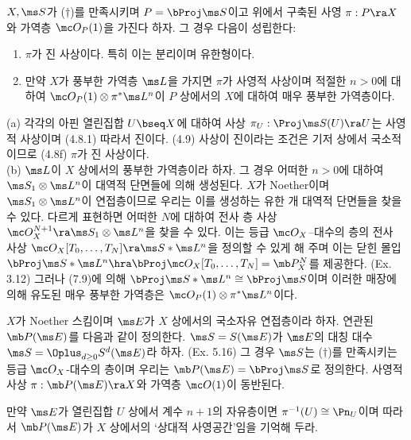 	
	\begin{proposition}
	$X,\ms S$가 ($\dag$)를 만족시키며 $P=\bProj\ms S$이고 위에서 구축된 사영 $\pi:P\ra X$와 가역층 $\mc O_P(1)$을 가진다 하자.
	그 경우 다음이 성립한다:
	\begin{enumerate}[label=(\alph*)]
	\item $\pi$가 진 사상이다. 특히 이는 분리이며 유한형이다.
	\item 만약 $X$가 풍부한 가역층 $\ms L$을 가지면 $\pi$가 사영적 사상이며
	적절한 $n>0$에 대하여 $\mc O_P(1)\otimes\pi^*\ms L^n$이 $P$ 상에서의 $X$에 대하여 매우 풍부한 가역층이다.\\
	\end{enumerate}
	\pf (a) 각각의 아핀 열린집합 $U\bseq X$에 대하여 사상 $\pi_U:\Proj\ms S(U)\ra U$는 사영적 사상이며 (4.8.1) 따라서 진이다. (4.9)
	사상이 진이라는 조건은 기저 상에서 국소적이므로 (4.8f) $\pi$가 진 사상이다.\\
	(b) $\ms L$이 $X$ 상에서의 풍부한 가역층이라 하자.
	그 경우 어떠한 $n>0$에 대하여 $\ms S_1\otimes\ms L^n$이 대역적 단면들에 의해 생성된다.
	$X$가 Noether이며 $\ms S_1\otimes\ms L^n$이 연접층이므로 우리는 이를 생성하는 유한 개 대역적 단면들을 찾을 수 있다.
	다르게 표현하면 어떠한 $N$에 대하여 전사 층 사상 $\mc O_X^{N+1}\ra\ms S_1\otimes\ms L^n$을 찾을 수 있다.
	이는 등급 $\mc O_X$--대수의 층의 전사 사상 $\mc O_X[T_0,\ldots,T_N]\ra\ms S*\ms L^n$을 정의할 수 있게 해 주며
	이는 닫힌 몰입 $\bProj\ms S*\ms L^n\hra\bProj\mc O_X[T_0,\ldots,T_N]=\mb P^N_X$를 제공한다. (Ex. 3.12)
	그러나 (7.9)에 의해 $\bProj\ms S*\ms L^n\cong\bProj\ms S$이며
	이러한 매장에 의해 유도된 매우 풍부한 가역층은 $\mc O_P(1)\otimes\pi^*\ms L^n$이다.
	\end{proposition}
	
	
	\begin{definition}
	$X$가 Noether 스킴이며 $\ms E$가 $X$ 상에서의 국소자유 연접층이라 하자.
	연관된  $\mb P(\ms E)$를 다음과 같이 정의한다.
	$\ms S=S(\ms E)$가 $\ms E$의 대칭 대수 $\ms S=\Oplus_{d\ge 0}S^d(\ms E)$라 하자. (Ex. 5.16)
	그 경우 $\ms S$는 ($\dag$)를 만족시키는 등급 $\mc O_X$-대수의 층이며 우리는 $\mb P(\ms E)=\bProj\ms S$로 정의한다.
	사영적 사상 $\pi:\mb P(\ms E)\ra X$와 가역층 $\mc O(1)$이 동반된다.
	\end{definition}
	
	만약 $\ms E$가 열린집합 $U$ 상에서 계수 $n+1$의 자유층이면 $\pi^{-1}(U)\cong\Pn_U$이며
	따라서 $\mb P(\ms E)$가 $X$ 상에서의 `상대적 사영공간'임을 기억해 두라.
	
